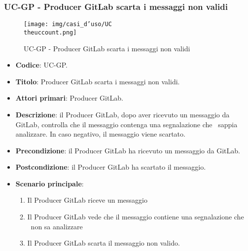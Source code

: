 \subsubsection{UC\theuccount-GP - Producer GitLab scarta i messaggi non validi}
    \begin{figure}[H]
		\centering
		\texttt{[image: img/casi\_d'uso/UC\\theuccount.png]}\\
		\caption{UC\theuccount-GP - Producer GitLab scarta i messaggi non validi}
	\end{figure}
	\begin{itemize}
		\item \textbf{Codice}: UC\theuccount-GP.
		\item \textbf{Titolo}: Producer GitLab scarta i messaggi non validi.
		\item \textbf{Attori primari}: Producer GitLab.
		\item \textbf{Descrizione}: il Producer GitLab, dopo aver ricevuto un messaggio da GitLab, controlla
        che il messaggio contenga una segnalazione che \progetto\ sappia analizzare. In caso negativo, il messaggio viene scartato.
        \item \textbf{Precondizione}: il Producer GitLab ha ricevuto un messaggio da GitLab.
        \item \textbf{Postcondizione}: il Producer GitLab ha scartato il messaggio.
        \item \textbf{Scenario principale}:
        \begin{enumerate}
            \item Il Producer GitLab riceve un messaggio
            \item Il Producer GitLab vede che il messaggio contiene una segnalazione che \progetto\ non sa analizzare
            \item Il Producer GitLab scarta il messaggio non valido.
        \end{enumerate}
    \end{itemize}
